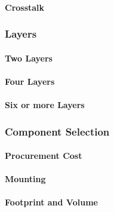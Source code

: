 \paragraph{Crosstalk}

\subsubsection{Layers}
\paragraph{Two Layers}
\paragraph{Four Layers}
\paragraph{Six or more Layers}

\subsubsection{Component Selection}
\paragraph{Procurement Cost}
\paragraph{Mounting}
\paragraph{Footprint and Volume}